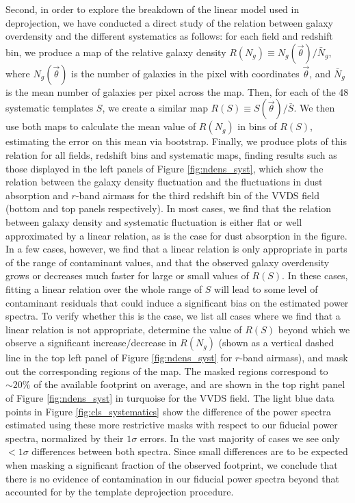 \documentclass[a4paper,11pt]{article}
\newcommand{\nv}{\vec{\theta}}
\begin{document}
      Second, in order to explore the breakdown of the linear model used in deprojection, we have conducted a direct study of the relation between galaxy overdensity and the different systematics as follows: for each field and redshift bin, we produce a map of the relative galaxy density $R(N_g)\equiv N_g(\nv)/\bar{N}_g$, where $N_g(\nv)$ is the number of galaxies in the pixel with coordinates $\nv$, and $\bar{N}_g$ is the mean number of galaxies per pixel across the map. Then, for each of the 48 systematic templates $S$, we create a similar map $R(S)\equiv S(\nv)/\bar{S}$. We then use both maps to calculate the mean value of $R(N_g)$ in bins of $R(S)$, estimating the error on this mean via bootstrap. Finally, we produce plots of this relation for all fields, redshift bins and systematic maps, finding results such as those displayed in the left panels of Figure \ref{fig:ndens_syst}, which show the relation between the galaxy density fluctuation and the fluctuations in dust absorption and $r$-band airmass for the third redshift bin of the VVDS field (bottom and top panels respectively). In most cases, we find that the relation between galaxy density and systematic fluctuation is either flat or well approximated by a linear relation, as is the case for dust absorption in the figure. In a few cases, however, we find that a linear relation is only appropriate in parts of the range of contaminant values, and that the observed galaxy overdensity grows or decreases much faster for large or small values of $R(S)$. In these cases, fitting a linear relation over the whole range of $S$ will lead to some level of contaminant residuals that could induce a significant bias on the estimated power spectra. To verify whether this is the case, we list all cases where we find that a linear relation is not appropriate, determine the value of $R(S)$ beyond which we observe a significant increase/decrease in $R(N_g)$ (shown as a vertical dashed line in the top left panel of Figure \ref{fig:ndens_syst} for $r$-band airmass), and mask out the corresponding regions of the map. The masked regions correspond to $\sim20\%$ of the available footprint on average, and are shown in the top right panel of Figure \ref{fig:ndens_syst} in turquoise for the VVDS field. The light blue data points in Figure \ref{fig:cls_systematics} show the difference of the power spectra estimated using these more restrictive masks with respect to our fiducial power spectra, normalized by their $1\sigma$ errors. In the vast majority of cases we see only $<1\sigma$ differences between both spectra. Since small differences are to be expected when masking a significant fraction of the observed footprint, we conclude that there is no evidence of contamination in our fiducial power spectra beyond that accounted for by the template deprojection procedure.
\end{document}
